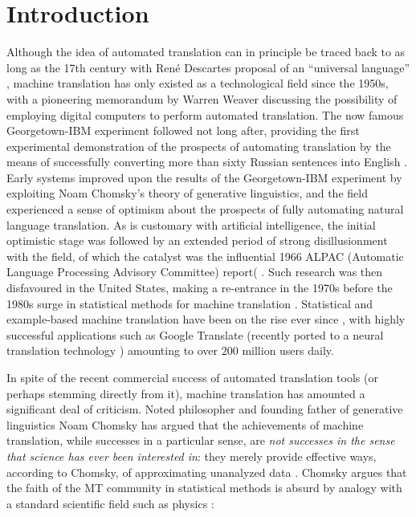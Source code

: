 \documentclass[twoside,11pt]{article}
\begin{document}
\section{Introduction}

Although the idea of automated translation can in principle be traced back to as long as the 17th century with Ren\'{e} Descartes proposal of an ``universal language'' \cite{dascal1982universal}, machine translation has only existed as a technological field since the 1950s, with a pioneering memorandum by  Warren Weaver \cite{locke1955machine,weaver1955translation} discussing the possibility of employing digital computers to perform automated translation. The now famous Georgetown-IBM experiment followed not long after, providing the first experimental demonstration of the prospects of automating translation by the means of successfully converting more than sixty Russian sentences into English \cite{gordin2015scientific}. Early systems improved upon the results of the Georgetown-IBM experiment by exploiting Noam Chomsky's theory of generative linguistics, and the field experienced a sense of optimism about the prospects of fully automating natural language translation. As is customary with artificial intelligence, the initial optimistic stage was followed by an extended period of strong disillusionment with the field, of which the catalyst was the influential 1966 ALPAC (Automatic Language Processing Advisory Committee) report( \cite{hutchins1986machine}. 
Such research was then disfavoured in the United States, making a re-entrance in the 1970s before the 1980s surge in statistical methods for machine translation \cite{koehn2009statistical,Moses2007}. Statistical and example-based machine translation have been on the rise ever since \cite{Bahdanau2014,carl2003recent,Firat2017}, with highly successful applications such as Google Translate (recently ported to a neural translation technology \cite{wu2016google}) amounting to over $200$ million users daily.

In spite of the recent commercial success of automated translation tools (or perhaps stemming directly from it), machine translation has amounted a significant deal of criticism. Noted philosopher and founding father of generative linguistics Noam Chomsky has argued that the achievements of machine translation, while successes in a particular sense, are \emph{not successes in the sense that science has ever been interested in}: they merely provide effective ways, according to Chomsky, of approximating unanalyzed data \cite{Chomsky2011,norvig2017chomsky}. Chomsky argues that the faith of the MT community in statistical methods is absurd by analogy with a standard scientific field such as physics \cite{Chomsky2011}:
\end{document}
